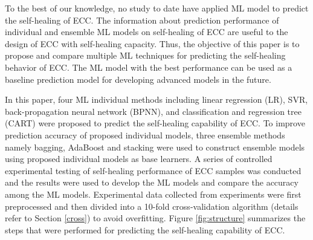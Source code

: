 \documentclass[11pt]{article}
\begin{document}
To the best of our knowledge, no study to date have applied ML model to predict the self-healing of ECC. The information about prediction performance of individual and ensemble ML models on self-healing of ECC are useful to the design of ECC with self-healing capacity. Thus, the objective of this paper is to propose and compare multiple ML techniques for predicting the self-healing behavior of ECC. The ML model with the best performance can be used as a baseline prediction model for developing advanced models in the future.

In this paper, four ML individual methods including linear regression (LR), SVR, back-propagation neural network (BPNN), and classification and regression tree (CART) were proposed to predict the self-healing capability of ECC. To improve prediction accuracy of proposed  individual models,  three ensemble methods namely bagging, AdaBoost and stacking were used to construct ensemble models using proposed individual models as base learners. A series of controlled experimental testing of self-healing performance of ECC samples was conducted and the results were used to develop the ML models and compare the accuracy among the ML models. Experimental data collected from experiments were first preprocessed and then divided into a 10-fold cross-validation algorithm (details refer to Section \ref{cross}) to avoid overfitting. Figure \ref{fig:structure} summarizes the steps that were performed for predicting the self-healing capability of ECC.
	
	
\end{document}
